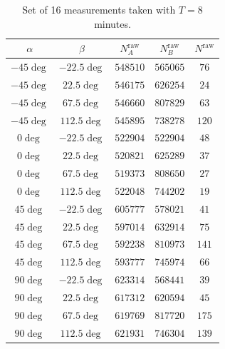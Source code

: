 \documentclass{../paper}
\begin{document}
\begin{table}
  \centering
  \begin{tabular}{ccccc}
    \hline
    \hline
    $\alpha$  & $\beta$    & $N_A^\text{raw}$ & $N_B^\text{raw}$ & $N^\text{raw}$ \\
    \hline
    $-45\deg$ & $-22.5\deg$ & $548510$         & $565065$         & $76$          \\
    $-45\deg$ & $22.5\deg$  & $546175$         & $626254$         & $24$          \\
    $-45\deg$ & $67.5\deg$  & $546660$         & $807829$         & $63$          \\
    $-45\deg$ & $112.5\deg$ & $545895$         & $738278$         & $120$         \\
    $0\deg$   & $-22.5\deg$ & $522904$         & $522904$         & $48$          \\
    $0\deg$   & $22.5\deg$  & $520821$         & $625289$         & $37$          \\
    $0\deg$   & $67.5\deg$  & $519373$         & $808650$         & $27$          \\
    $0\deg$   & $112.5\deg$ & $522048$         & $744202$         & $19$          \\
    $45\deg$  & $-22.5\deg$ & $605777$         & $578021$         & $41$          \\
    $45\deg$  & $22.5\deg$  & $597014$         & $632914$         & $75$          \\
    $45\deg$  & $67.5\deg$  & $592238$         & $810973$         & $141$         \\
    $45\deg$  & $112.5\deg$ & $593777$         & $745974$         & $66$          \\
    $90\deg$  & $-22.5\deg$ & $623314$         & $568441$         & $39$          \\
    $90\deg$  & $22.5\deg$  & $617312$         & $620594$         & $45$          \\
    $90\deg$  & $67.5\deg$  & $619769$         & $817720$         & $175$         \\
    $90\deg$  & $112.5\deg$ & $621931$         & $746304$         & $139$         \\
    \hline
  \end{tabular}
  \caption{Set of 16 measurements taken with $T = 8$ minutes.}
  \label{tab:16-measurements}
\end{table}
\end{document}
